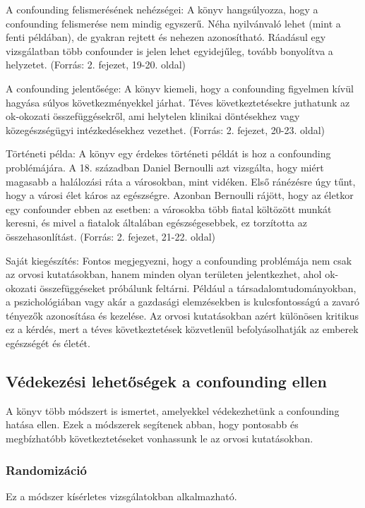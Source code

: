 \documentclass[a4paper,12pt]{article}
\begin{document}
    A confounding felismerésének nehézségei: A könyv hangsúlyozza, hogy a confounding felismerése nem mindig egyszerű. Néha nyilvánvaló lehet (mint a fenti példában), de gyakran rejtett és nehezen azonosítható. Ráadásul egy vizsgálatban több confounder is jelen lehet egyidejűleg, tovább bonyolítva a helyzetet. (Forrás: 2. fejezet, 19-20. oldal)

    A confounding jelentősége: A könyv kiemeli, hogy a confounding figyelmen kívül hagyása súlyos következményekkel járhat. Téves következtetésekre juthatunk az ok-okozati összefüggésekről, ami helytelen klinikai döntésekhez vagy közegészségügyi intézkedésekhez vezethet. (Forrás: 2. fejezet, 20-23. oldal)

    Történeti példa: A könyv egy érdekes történeti példát is hoz a confounding problémájára. A 18. században Daniel Bernoulli azt vizsgálta, hogy miért magasabb a halálozási ráta a városokban, mint vidéken. Első ránézésre úgy tűnt, hogy a városi élet káros az egészségre. Azonban Bernoulli rájött, hogy az életkor egy confounder ebben az esetben: a városokba több fiatal költözött munkát keresni, és mivel a fiatalok általában egészségesebbek, ez torzította az összehasonlítást. (Forrás: 2. fejezet, 21-22. oldal)

    Saját kiegészítés: Fontos megjegyezni, hogy a confounding problémája nem csak az orvosi kutatásokban, hanem minden olyan területen jelentkezhet, ahol ok-okozati összefüggéseket próbálunk feltárni. Például a társadalomtudományokban, a pszichológiában vagy akár a gazdasági elemzésekben is kulcsfontosságú a zavaró tényezők azonosítása és kezelése. Az orvosi kutatásokban azért különösen kritikus ez a kérdés, mert a téves következtetések közvetlenül befolyásolhatják az emberek egészségét és életét.

    \subsection{Védekezési lehetőségek a confounding ellen}

    A könyv több módszert is ismertet, amelyekkel védekezhetünk a confounding hatása ellen. Ezek a módszerek segítenek abban, hogy pontosabb és megbízhatóbb következtetéseket vonhassunk le az orvosi kutatásokban.

    \subsubsection{Randomizáció}

    Ez a módszer kísérletes vizsgálatokban alkalmazható.
\end{document}
